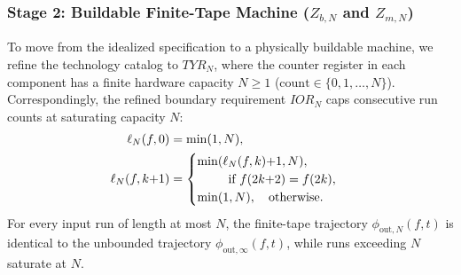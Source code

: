 \subsubsection{Stage 2: Buildable Finite-Tape Machine (\texorpdfstring{$Z_{b,N}$ and $Z_{m,N}$}{Zb,N and Zm,N})}
\label{sec:case-machine-zones}
To move from the idealized specification to a physically buildable machine, we refine the technology catalog to $TYR_N$, where the counter register in each component has a finite hardware capacity $N\ge 1$ ($\mathrm{count}\in\{0,1,\dots,N\}$). Correspondingly, the refined boundary requirement $IOR_N$ caps consecutive run counts at saturating capacity $N$:
\begin{equation}
\begin{aligned}
  \ell_N(f,0) &= \min(1,N), \\
  \ell_N(f,k{+}1) &=
  \begin{cases}
    \min(\ell_N(f,k){+}1,N),\\
    \hspace{2.5em}\text{if } f(2k{+}2)=f(2k),\\
    \min(1,N),\quad \text{otherwise.}
  \end{cases}
\end{aligned}
  \label{eq:rle-fin-recurrence}
\end{equation}
For every input run of length at most $N$, the finite-tape trajectory $\phi_{\mathrm{out},N}(f,t)$ is identical to the unbounded trajectory $\phi_{\mathrm{out},\infty}(f,t)$, while runs exceeding $N$ saturate at $N$.

